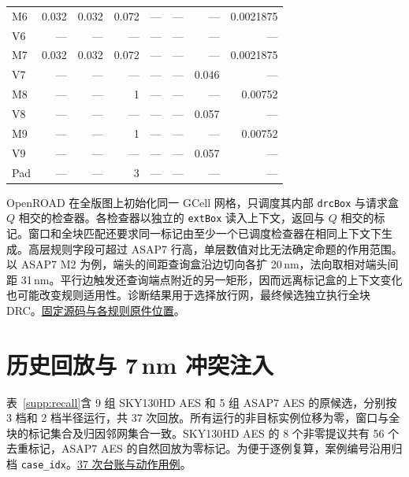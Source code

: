 \documentclass[10pt,a4paper,fontset=windows]{ctexart}
\newcommand{\Evidence}[2]{\href{https://github.com/Toylog123/FAECO/blob/f0fe992b9ce44b8368b620d06b8d95a56179347c/project_docs/evidence/#1}{#2}}
\newcommand{\Vfive}[2]{\Evidence{tcad_v5_revision_20261126/#1}{#2}}
\begin{document}
\begin{longtable}{@{}lrrrrrrr@{}}
M6 & 0.032 & 0.032 & 0.072 & --- & --- & --- & 0.0021875 \\
V6 & --- & --- & --- & --- & --- & --- & --- \\
M7 & 0.032 & 0.032 & 0.072 & --- & --- & --- & 0.0021875 \\
V7 & --- & --- & --- & --- & --- & 0.046 & --- \\
M8 & --- & --- & 1 & --- & --- & --- & 0.00752 \\
V8 & --- & --- & --- & --- & --- & 0.057 & --- \\
M9 & --- & --- & 1 & --- & --- & --- & 0.00752 \\
V9 & --- & --- & --- & --- & --- & 0.057 & --- \\
Pad & --- & --- & 3 & --- & --- & --- & --- \\
\bottomrule
\end{longtable}

OpenROAD 在全版图上初始化同一 GCell 网格，只调度其内部 \texttt{drcBox} 与请求盒 $Q$ 相交的检查器。各检查器以独立的 \texttt{extBox} 读入上下文，返回与 $Q$ 相交的标记。窗口和全块匹配还要求同一标记由至少一个已调度检查器在相同上下文下生成。高层规则字段可超过 ASAP7 行高，单层数值对比无法确定命题的作用范围。以 ASAP7 M2 为例，端头的间距查询盒沿边切向各扩 20\,nm，法向取相对端头间距 31\,nm。平行边触发还查询端点附近的另一矩形，因而远离标记盒的上下文变化也可能改变规则适用性。诊断结果用于选择放行网，最终候选独立执行全块 DRC。\Vfive{WINDOW_RULE_SCOPE.md}{固定源码与各规则原件位置}。

\section{历史回放与 7\,nm 冲突注入}\label{sec:B}

表~\ref{supp:recall}含 9 组 SKY130HD AES 和 5 组 ASAP7 AES 的原候选，分别按 3 档和 2 档半径运行，共 37 次回放。所有运行的非目标实例位移为零，窗口与全块的标记集合及归因邻网集合一致。SKY130HD AES 的 8 个非零提议共有 56 个去重标记，ASAP7 AES 的自然回放为零标记。为便于逐例复算，案例编号沿用归档 \texttt{case\_idx}。\Evidence{tcad_boxed_drc_20261126/BOXED_DRC_RECALL_AUDIT.json}{37 次台账与动作用例}。
\end{document}
